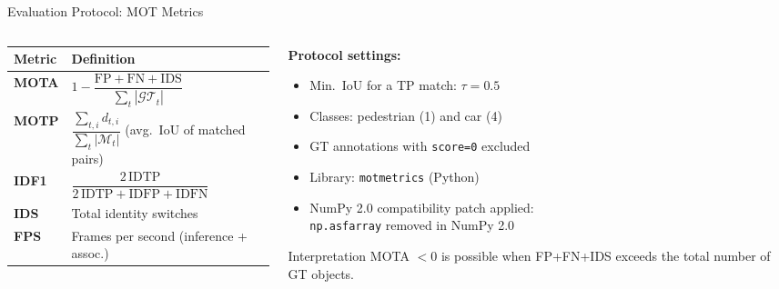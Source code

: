\documentclass[aspectratio=169]{beamer}
\begin{document}
\begin{frame}{Evaluation Protocol: MOT Metrics}
  \begin{columns}[T]
    \begin{column}{0.54\textwidth}
      \renewcommand{\arraystretch}{1.4}
      \small
      \begin{tabular}{p{1.0cm}p{5.3cm}}
        \toprule
        \textbf{Metric} & \textbf{Definition}                                       \\
        \midrule
        \textbf{MOTA}   &
        $1 - \dfrac{\mathrm{FP}+\mathrm{FN}+\mathrm{IDS}}{\sum_t |\mathcal{GT}_t|}$ \\[6pt]
        \textbf{MOTP}   &
        $\dfrac{\sum_{t,i} d_{t,i}}{\sum_t |\mathcal{M}_t|}$
        \;(avg.\ IoU of matched pairs)                                              \\[6pt]
        \textbf{IDF1}   &
        $\dfrac{2\,\mathrm{IDTP}}{2\,\mathrm{IDTP}+\mathrm{IDFP}+\mathrm{IDFN}}$    \\[6pt]
        \textbf{IDS}    & Total identity switches                                   \\
        \textbf{FPS}    & Frames per second (inference + assoc.)                    \\
        \bottomrule
      \end{tabular}
    \end{column}
    \begin{column}{0.42\textwidth}
      \textbf{Protocol settings:}
      \begin{itemize}
        \item Min.\ IoU for a TP match: $\tau=0.5$
        \item Classes: pedestrian (1) and car (4)
        \item GT annotations with \texttt{score=0} excluded
        \item Library: \texttt{motmetrics} (Python)
        \item NumPy 2.0 compatibility patch applied:\\
              {\scriptsize\texttt{np.asfarray} removed in NumPy 2.0}
      \end{itemize}
      \begin{alertblock}{Interpretation}
        \small MOTA $<0$ is possible when FP+FN+IDS exceeds
        the total number of GT objects.
      \end{alertblock}
    \end{column}
  \end{columns}
\end{frame}
\end{document}
